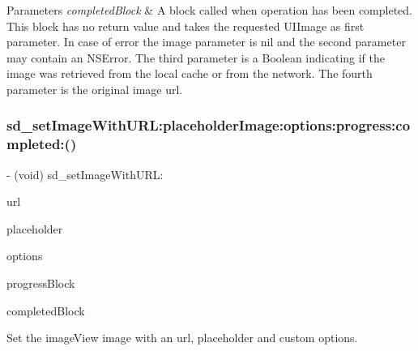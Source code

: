 \begin{DoxyParams}{Parameters}
{\em completed\+Block} & A block called when operation has been completed. This block has no return value and takes the requested U\+I\+Image as first parameter. In case of error the image parameter is nil and the second parameter may contain an N\+S\+Error. The third parameter is a Boolean indicating if the image was retrieved from the local cache or from the network. The fourth parameter is the original image url. \\
\hline
\end{DoxyParams}
\mbox{\label{category_u_i_image_view_07_web_cache_08_a05de992a3162a51f223a248ceaa60856}} 
\subsubsection{\texorpdfstring{sd\+\_\+set\+Image\+With\+U\+R\+L\+:placeholder\+Image\+:options\+:progress\+:completed\+:()}{sd\_setImageWithURL:placeholderImage:options:progress:completed:()}\hspace{0.1cm}{\footnotesize\ttfamily [1/3]}}
{\footnotesize\ttfamily -\/ (void) sd\+\_\+set\+Image\+With\+U\+R\+L\+: \begin{DoxyParamCaption}\item[{(N\+S\+U\+RL $\ast$)}]{url }\item[{placeholderImage:(U\+I\+Image $\ast$)}]{placeholder }\item[{options:(S\+D\+Web\+Image\+Options)}]{options }\item[{progress:(S\+D\+Web\+Image\+Downloader\+Progress\+Block)}]{progress\+Block }\item[{completed:(S\+D\+Web\+Image\+Completion\+Block)}]{completed\+Block }\end{DoxyParamCaption}}

Set the image\+View {\ttfamily image} with an {\ttfamily url}, placeholder and custom options.


